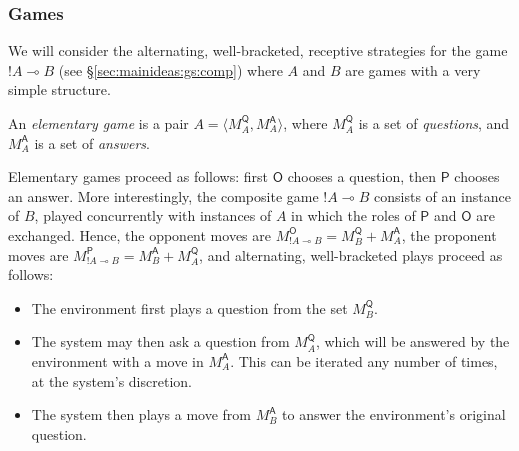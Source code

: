 \documentclass[acmsmall,timestamp,review,anonymous]{acmart}
\newcommand{\kw}[1]{\ensuremath{ \mathsf{#1} }}
\begin{document}
\subsubsection{Games} %

We will consider the alternating, well-bracketed, receptive strategies
for the game $!A \multimap B$ (see \S\ref{sec:mainideas:gs:comp})
where $A$ and $B$ are games with a very simple structure.

\begin{definition} \label{def:elemgame} %
An \emph{elementary game} is a pair
$A = \langle M_A^\kw{Q}, M_A^\kw{A} \rangle$, where
$M_A^\kw{Q}$ is a set of \emph{questions}, and
$M_A^\kw{A}$ is a set of \emph{answers}.
\end{definition}

Elementary games proceed as follows:
first $\kw{O}$ chooses a question,
then $\kw{P}$ chooses an answer.
More interestingly,
the composite game $!A \multimap B$
consists of
an instance of $B$, played concurrently with
instances of $A$ in which the roles of $\kw{P}$ and $\kw{O}$ are exchanged.
Hence,
the opponent moves are
$M^\kw{O}_{!A \multimap B} = M^\kw{Q}_B + M^\kw{A}_A$,
the proponent moves are
$M^\kw{P}_{!A \multimap B} = M^\kw{A}_B + M^\kw{Q}_A$,
and alternating, well-bracketed plays
proceed as follows:
\begin{itemize}
  \item The environment first plays a question from the set $M_B^\kw{Q}$.
  \item The system may then ask a question from $M_A^\kw{Q}$,
    which will be answered by the environment with a move in $M_A^\kw{A}$.
    This can be iterated any number of times, at the system's discretion.
  \item The system then plays a move from $M_B^\kw{A}$
    to answer the environment's original question.
\end{itemize}
\end{document}
